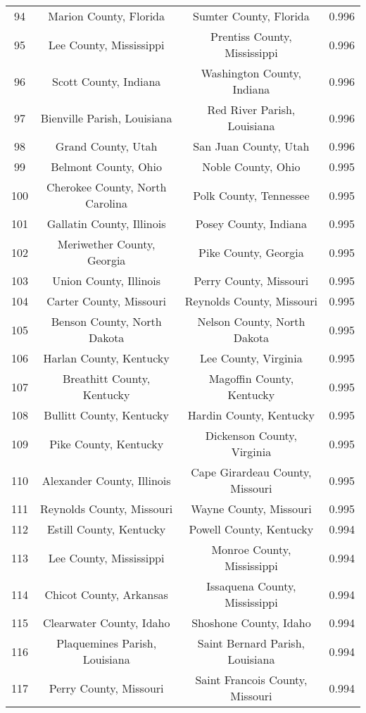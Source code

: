 \begin{longtable}{cccc}
  94 & Marion County, Florida & Sumter County, Florida & 0.996 \\ 
  95 & Lee County, Mississippi & Prentiss County, Mississippi & 0.996 \\ 
  96 & Scott County, Indiana & Washington County, Indiana & 0.996 \\ 
  97 & Bienville Parish, Louisiana & Red River Parish, Louisiana & 0.996 \\ 
  98 & Grand County, Utah & San Juan County, Utah & 0.996 \\ 
  99 & Belmont County, Ohio & Noble County, Ohio & 0.995 \\ 
  100 & Cherokee County, North Carolina & Polk County, Tennessee & 0.995 \\ 
  101 & Gallatin County, Illinois & Posey County, Indiana & 0.995 \\ 
  102 & Meriwether County, Georgia & Pike County, Georgia & 0.995 \\ 
  103 & Union County, Illinois & Perry County, Missouri & 0.995 \\ 
  104 & Carter County, Missouri & Reynolds County, Missouri & 0.995 \\ 
  105 & Benson County, North Dakota & Nelson County, North Dakota & 0.995 \\ 
  106 & Harlan County, Kentucky & Lee County, Virginia & 0.995 \\ 
  107 & Breathitt County, Kentucky & Magoffin County, Kentucky & 0.995 \\ 
  108 & Bullitt County, Kentucky & Hardin County, Kentucky & 0.995 \\ 
  109 & Pike County, Kentucky & Dickenson County, Virginia & 0.995 \\ 
  110 & Alexander County, Illinois & Cape Girardeau County, Missouri & 0.995 \\ 
  111 & Reynolds County, Missouri & Wayne County, Missouri & 0.995 \\ 
  112 & Estill County, Kentucky & Powell County, Kentucky & 0.994 \\ 
  113 & Lee County, Mississippi & Monroe County, Mississippi & 0.994 \\ 
  114 & Chicot County, Arkansas & Issaquena County, Mississippi & 0.994 \\ 
  115 & Clearwater County, Idaho & Shoshone County, Idaho & 0.994 \\ 
  116 & Plaquemines Parish, Louisiana & Saint Bernard Parish, Louisiana & 0.994 \\ 
  117 & Perry County, Missouri & Saint Francois County, Missouri & 0.994 \\ 

\end{longtable}
